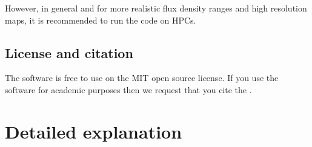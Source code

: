 \documentclass[letterpaper,10pt,english]{sphinxmanual}
\begin{document}
\sphinxAtStartPar
However, in general and for more realistic flux density ranges and high
resolution maps, it is recommended to run the code on HPCs.


\section{License and citation}
\label{\detokenize{basics:license-and-citation}}
\sphinxAtStartPar
The software is free to use on the MIT open source license. If you use the software for academic purposes then we request that you cite
the .

\sphinxstepscope


\chapter{Detailed explanation}
\label{\detokenize{detexp:detailed-explanation}}\label{\detokenize{detexp::doc}}
\end{document}
